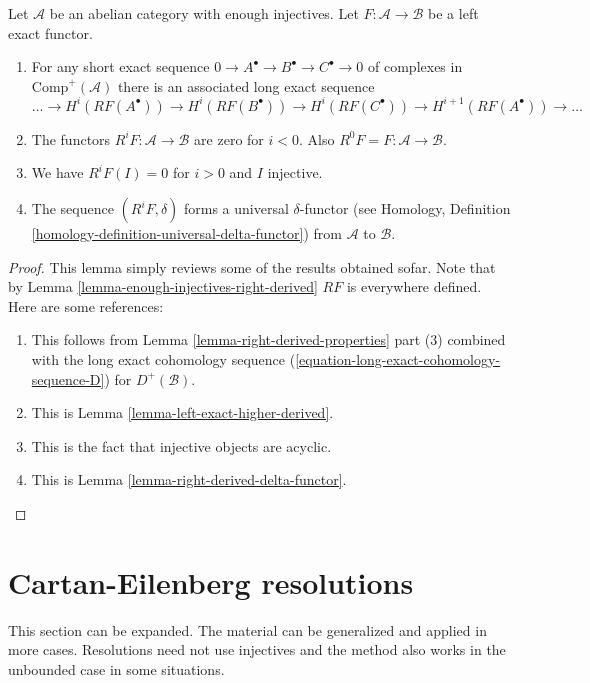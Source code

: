 \begin{lemma}
\label{lemma-higher-derived-functors}
Let $\mathcal{A}$ be an abelian category with enough injectives.
Let $F : \mathcal{A} \to \mathcal{B}$ be a left exact functor.
\begin{enumerate}
\item For any short exact sequence
$0 \to A^\bullet \to B^\bullet \to C^\bullet \to 0$
of complexes in $\text{Comp}^{+}(\mathcal{A})$ there
is an associated long exact sequence
$$
\ldots \to
H^i(RF(A^\bullet)) \to
H^i(RF(B^\bullet)) \to
H^i(RF(C^\bullet)) \to
H^{i + 1}(RF(A^\bullet)) \to \ldots
$$
\item The functors $R^iF : \mathcal{A} \to \mathcal{B}$
are zero for $i < 0$. Also $R^0F = F : \mathcal{A} \to \mathcal{B}$.
\item We have $R^iF(I) = 0$ for $i > 0$ and $I$ injective.
\item The sequence $(R^iF, \delta)$ forms a universal $\delta$-functor (see
Homology, Definition \ref{homology-definition-universal-delta-functor})
from $\mathcal{A}$ to $\mathcal{B}$.
\end{enumerate}
\end{lemma}

\begin{proof}
This lemma simply reviews some of the results obtained sofar.
Note that by
Lemma \ref{lemma-enough-injectives-right-derived}
$RF$ is everywhere defined. Here are some references:
\begin{enumerate}
\item This follows from
Lemma \ref{lemma-right-derived-properties} part (3)
combined with the long exact cohomology sequence
(\ref{equation-long-exact-cohomology-sequence-D}) for
$D^{+}(\mathcal{B})$.
\item This is
Lemma \ref{lemma-left-exact-higher-derived}.
\item This is the fact that injective objects are acyclic.
\item This is
Lemma \ref{lemma-right-derived-delta-functor}.
\end{enumerate}
\end{proof}






\section{Cartan-Eilenberg resolutions}
\label{section-cartan-eilenberg}

\noindent
This section can be expanded. The material can be generalized and applied in
more cases. Resolutions need not use injectives and the method also
works in the unbounded case in some situations.

